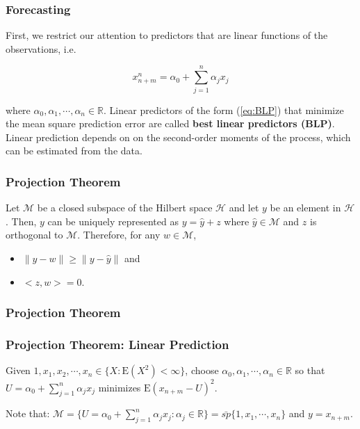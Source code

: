 \documentclass[%
xcolor=pdftex]{beamer}
\begin{document}
\begin{frame}
\frametitle{Forecasting}

First, we restrict our attention to predictors that are linear functions of the observations, i.e.

\begin{equation} \label{eq:BLP}
x_{n+m}^n = \alpha_0 + \sum_{j=1}^n \alpha_j x_j
\end{equation}

where $\alpha_0, \alpha_1, \cdots, \alpha_n \in \mathbb{R}$. Linear predictors of the form (\ref{eq:BLP}) that minimize the mean square prediction error are called \textbf{best linear predictors (BLP)}.\\

\vspace{5mm}
Linear prediction depends on on the second-order moments of the process, which can be estimated from the data.

\end{frame}

\begin{frame}
\frametitle{Projection Theorem}

\begin{theorem}
\label{projection}
Let $\mathcal{M}$ be a closed subspace of the Hilbert space $\mathcal{H}$ and let $y$ be an element in $\mathcal{H}$. Then, $y$ can be uniquely represented as $y = \hat{y} + z$ where $\hat{y} \in \mathcal{M}$ and $z$ is orthogonal to $\mathcal{M}$. Therefore, for any $w \in \mathcal{M}$,

\begin{itemize}
\item $\lVert y-w \rVert \geq \lVert y-\hat{y} \rVert$ and
\item $<z,w> = 0$.
\end{itemize}
\end{theorem}


\end{frame}

\begin{frame}
\frametitle{Projection Theorem}


\end{frame}

\begin{frame}
\frametitle{Projection Theorem: Linear Prediction}

Given $1, x_1, x_2, \cdots, x_n \in \{X: \mbox{E}(X^2) < \infty \}$, choose $\alpha_0, \alpha_1, \cdots, \alpha_n \in \mathbb{R}$ so that $U = \alpha_0 + \sum_{j=1}^n \alpha_j x_j$ minimizes $\mbox{E}(x_{n+m} - U)^2$.\\
\vspace{5mm}

Note that: $\mathcal{M} = \{U = \alpha_0 + \sum_{j=1}^n \alpha_j x_j: \alpha_j \in \mathbb{R} \} = \bar{sp}\{1,x_1, \cdots, x_n \}$ and $y=x_{n+m}$.
\end{frame}
\end{document}
